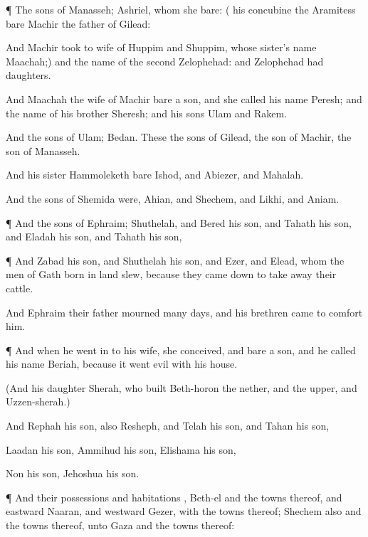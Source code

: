 {\par }{\PP {}¶ The
sons of
Manasseh;
Ashriel, whom she
bare: ({} his
concubine the
Aramitess
bare
Machir the
father of
Gilead:

And
Machir
took to
wife
{} of
Huppim and
Shuppim, whose
sister’s
name
{}
Maachah;) and the
name of the
second
{}
Zelophehad: and
Zelophehad had
daughters.

And
Maachah the
wife of
Machir
bare a
son, and she
called his
name
Peresh; and the
name of his
brother
{}
Sheresh; and his
sons
{}
Ulam and
Rakem.

And the
sons of
Ulam;
Bedan. These
{} the
sons of
Gilead, the
son of
Machir, the
son of
Manasseh.

And his
sister
Hammoleketh
bare
Ishod, and
Abiezer, and
Mahalah.

And the
sons of
Shemida were,
Ahian, and
Shechem, and
Likhi, and
Aniam.


\par }{\PP {}¶ And the
sons of
Ephraim;
Shuthelah, and
Bered his
son, and
Tahath his
son, and
Eladah his
son, and
Tahath his
son,


\par }{\PP {}¶ And
Zabad his
son, and
Shuthelah his
son, and
Ezer, and
Elead, whom the
men of
Gath
{}
born in
{}
land
slew, because they came
down to take
away their
cattle.

And
Ephraim their
father
mourned
many
days, and his
brethren
came to
comfort him.


\par }{\PP {}¶ And when he went
in to his
wife, she
conceived, and
bare a
son, and he
called his
name
Beriah, because it went
evil with his
house.

(And his
daughter
{}
Sherah, who
built
Beth-horon the
nether, and the
upper, and
Uzzen-sherah.)

And
Rephah
{} his
son, also
Resheph, and
Telah his
son, and
Tahan his
son,

Laadan his
son,
Ammihud his
son,
Elishama his
son,

Non his
son,
Jehoshua his
son.


\par }{\PP {}¶ And their
possessions and
habitations
{},
Beth-el and the
towns thereof, and
eastward
Naaran, and
westward
Gezer, with the
towns thereof;
Shechem also and the
towns thereof, unto
Gaza and the
towns thereof:

}
